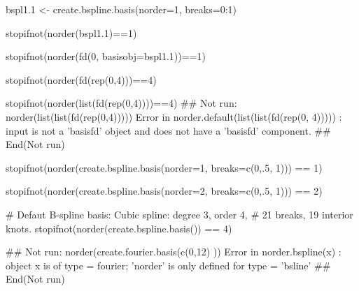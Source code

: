 \documentclass{article}
\begin{document}
\begin{Examples}
\begin{ExampleCode}
bspl1.1 <- create.bspline.basis(norder=1, breaks=0:1)

stopifnot(norder(bspl1.1)==1)

stopifnot(norder(fd(0, basisobj=bspl1.1))==1)

stopifnot(norder(fd(rep(0,4)))==4)

stopifnot(norder(list(fd(rep(0,4))))==4)
## Not run: 
norder(list(list(fd(rep(0,4)))))
Error in norder.default(list(list(fd(rep(0, 4))))) : 
  input is not a 'basisfd' object and does not have a 'basisfd'
component. 
## End(Not run)

stopifnot(norder(create.bspline.basis(norder=1, breaks=c(0,.5, 1))) == 1) 

stopifnot(norder(create.bspline.basis(norder=2, breaks=c(0,.5, 1))) == 2)

# Defaut B-spline basis:  Cubic spline:  degree 3, order 4,
# 21 breaks, 19 interior knots.  
stopifnot(norder(create.bspline.basis()) == 4)

## Not run: 
norder(create.fourier.basis(c(0,12) ))
Error in norder.bspline(x) : 
  object x is of type = fourier;  'norder' is only defined for type = 'bsline'
## End(Not run)

\end{ExampleCode}
\end{Examples}
\end{document}
